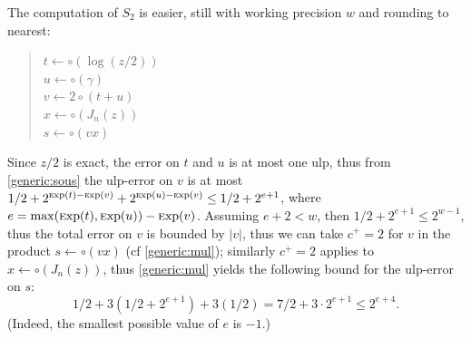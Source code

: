 \documentclass[12pt]{amsart}
\def\Exp{{\rm \textsc exp}}
\begin{document}
The computation of $S_2$ is easier, still with working precision $w$ and
rounding to nearest:
\begin{quote}
$t \leftarrow \circ(\log(z/2))$ \\
$u \leftarrow \circ(\gamma)$ \\
$v \leftarrow 2 \circ(t + u)$  \\
$x \leftarrow \circ(J_n(z))$ \\
$s \leftarrow \circ(v x)$
\end{quote}
Since $z/2$ is exact, the error on $t$ and $u$ is at most one ulp,
thus from \textsection\ref{generic:sous} the ulp-error on $v$ is at most
$1/2 + 2^{\Exp(t)-\Exp(v)} + 2^{\Exp(u)-\Exp(v)} \leq 1/2 + 2^{e+1}$, where
$e = {\rm max}(\Exp(t), \Exp(u)) - \Exp(v)$. Assuming $e+2 < w$, then
$1/2 + 2^{e+1} \leq 2^{w-1}$, thus the total error on $v$ is bounded by $|v|$,
thus we can take $c^+ = 2$ for $v$ in the product $s \leftarrow \circ(v x)$
(cf \textsection\ref{generic:mul}); similarly $c^+ = 2$ applies to
$x \leftarrow \circ(J_n(z))$, thus \textsection\ref{generic:mul} yields the
following bound for the ulp-error on $s$:
\[ 1/2 + 3 (1/2 + 2^{e+1}) + 3 (1/2) = 7/2 + 3 \cdot 2^{e+1} \leq 2^{e+4}. \]
(Indeed, the smallest possible value of $e$ is $-1$.)
\end{document}
